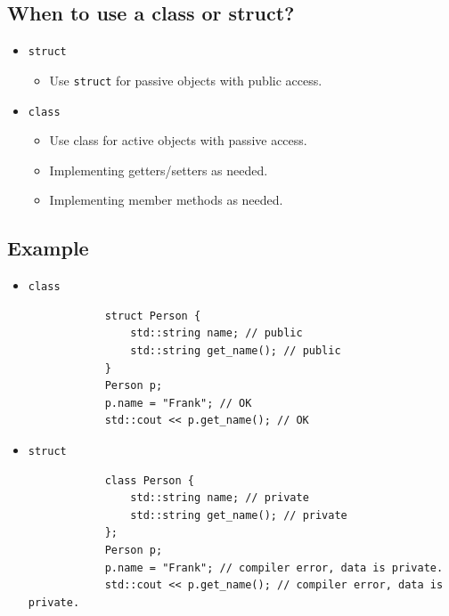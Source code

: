\subsection{When to use a class or struct?}
\begin{itemize}
    \item \texttt{struct}
        \begin{itemize}
            \item Use \texttt{struct} for passive objects with public access.
        \end{itemize}
    \item \texttt{class}
        \begin{itemize}
            \item Use class for active objects with passive access.
            \item Implementing getters/setters as needed.
            \item Implementing member methods as needed.
        \end{itemize}
\end{itemize}

\subsection{Example}
\begin{itemize}
    \item \texttt{class}
        \begin{verbatim}
            struct Person {
                std::string name; // public
                std::string get_name(); // public 
            }
            Person p;
            p.name = "Frank"; // OK
            std::cout << p.get_name(); // OK
        \end{verbatim}
        
    \item \texttt{struct}
        \begin{verbatim}
            class Person {
                std::string name; // private
                std::string get_name(); // private
            };
            Person p;
            p.name = "Frank"; // compiler error, data is private.
            std::cout << p.get_name(); // compiler error, data is private.
        \end{verbatim}
\end{itemize}


